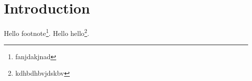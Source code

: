 \chapter{Introduction}
\lipsum
Hello footnote\footnote{fanjdakjnad}.
Hello hello\footnote{kdhbdhbvjdskbv}.\cite{control}